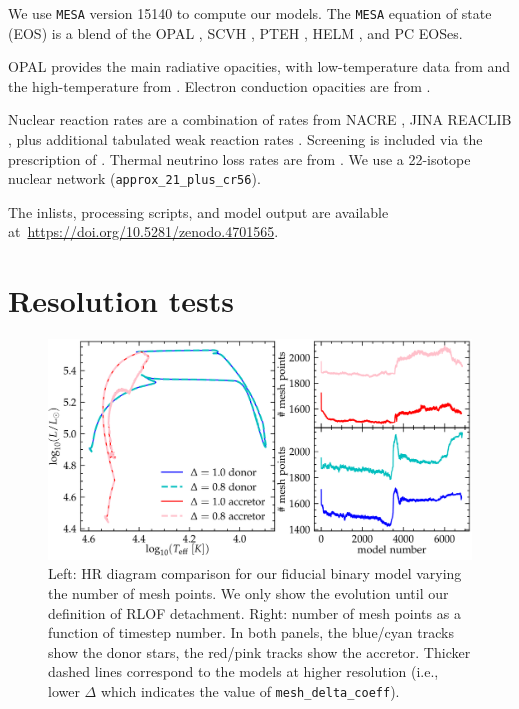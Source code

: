 \documentclass[twocolumn,twocolappendix,trackchanges]{aastex63}
\newcommand{\code}[1]{\texttt{#1}}
\begin{document}
We use \code{MESA} version 15140 to compute our models.  The
\code{MESA} equation of state (EOS) is a blend of the OPAL \citet{Rogers2002}, SCVH
\citet{Saumon1995}, PTEH \citet{Pols1995}, HELM \citet{Timmes2000},
and PC \citet{Potekhin2010} EOSes.

OPAL \citep{Iglesias1993, Iglesias1996} provides the main radiative
opacities, with low-temperature data from \citet{Ferguson2005} and the
high-temperature from \citet{Buchler1976}. Electron conduction
opacities are from \citet{Cassisi2007}.

Nuclear reaction rates are a combination of rates from NACRE
\citep{Angulo1999}, JINA REACLIB \citep{Cyburt2010}, plus additional
tabulated weak reaction rates \citet{Fuller1985, Oda1994,
  Langanke2000}. Screening is included via the prescription of
\citet{Chugunov2007}.  Thermal neutrino loss rates are from
\citet{Itoh1996}. We use a
22-isotope nuclear network (\texttt{approx\_21\_plus\_cr56}).

The inlists, processing scripts, and model output are available at~\url{https://doi.org/10.5281/zenodo.4701565}.

\section{Resolution tests}
\label{sec:res_tests}


\begin{figure}[htbp]
  \centering
  \includegraphics[width=\textwidth]{spatial_res_plot}
  \caption{Left: HR diagram comparison for our fiducial binary model varying
  the number of mesh points. We only show the evolution until our definition
  of RLOF detachment. Right: number of mesh points as a
  function of timestep number. In both panels, the blue/cyan tracks show the donor stars, the
red/pink tracks show the accretor. Thicker dashed lines correspond to
the models at higher resolution (i.e., lower $\Delta$ which indicates
the value of \texttt{mesh\_delta\_coeff}).}
\label{fig:sp_test}
\end{figure}
\end{document}
